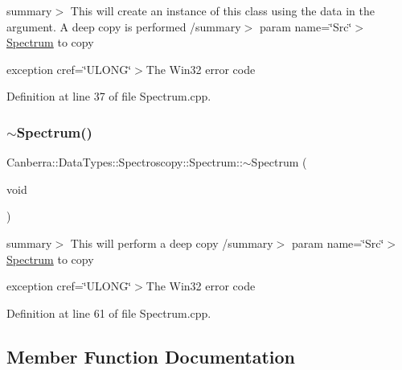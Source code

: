 summary$>$ This will create an instance of this class using the data in the argument. A deep copy is performed /summary$>$ param name=\char`\"{}\+Src\char`\"{}$>$\hyperlink{class_canberra_1_1_data_types_1_1_spectroscopy_1_1_spectrum}{Spectrum} to copy

exception cref=\char`\"{}\+U\+L\+O\+N\+G\char`\"{}$>$The Win32 error code

Definition at line 37 of file Spectrum.\+cpp.

\mbox{\label{class_canberra_1_1_data_types_1_1_spectroscopy_1_1_spectrum_a9b7804a1f756950235bfdf6ca60f52fd_a9b7804a1f756950235bfdf6ca60f52fd}} 
\subsubsection{\texorpdfstring{$\sim$\+Spectrum()}{~Spectrum()}}
{\footnotesize\ttfamily Canberra\+::\+Data\+Types\+::\+Spectroscopy\+::\+Spectrum\+::$\sim$\+Spectrum (\begin{DoxyParamCaption}\item[{void}]{ }\end{DoxyParamCaption})\hspace{0.3cm}{\ttfamily [virtual]}}

summary$>$ This will perform a deep copy /summary$>$ param name=\char`\"{}\+Src\char`\"{}$>$\hyperlink{class_canberra_1_1_data_types_1_1_spectroscopy_1_1_spectrum}{Spectrum} to copy

exception cref=\char`\"{}\+U\+L\+O\+N\+G\char`\"{}$>$The Win32 error code

Definition at line 61 of file Spectrum.\+cpp.



\subsection{Member Function Documentation}
\mbox{\label{class_canberra_1_1_data_types_1_1_spectroscopy_1_1_spectrum_a358ff2d9dcd18a0526c40b60d5e8e287_a358ff2d9dcd18a0526c40b60d5e8e287}} 
